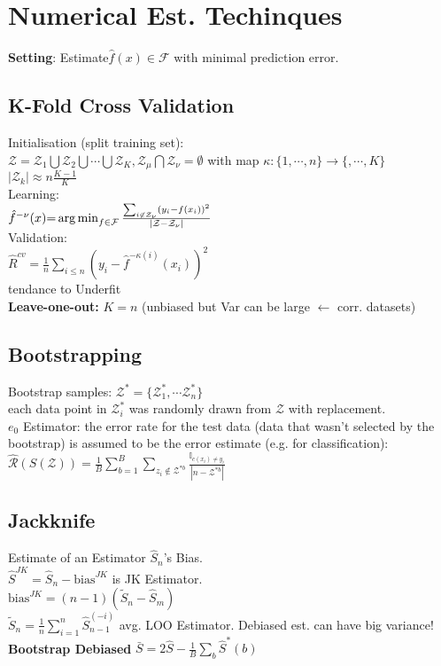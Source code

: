 \section*{Numerical Est. Techinques}
\textbf{Setting}: Estimate$\hat{f}(x) \in \mathcal{F}$ with minimal prediction error.

\subsection*{K-Fold Cross Validation}
Initialisation (split training set):\\
$\mathcal{Z}=\mathcal{Z}_1\bigcup\mathcal{Z}_2\bigcup\cdots\bigcup\mathcal{Z}_K, \mathcal{Z}_\mu \bigcap\mathcal{Z}_\nu = \emptyset $
with map $\kappa:\{1,\cdots, n\} \rightarrow\{, \cdots, K\}$
$|\mathcal{Z}_k|\approx n\frac{K-1}{K}$\\
Learning:\\
$\hat{f}^{-\nu}(x){=}
\operatorname*{arg\,min}_{f\in\mathcal{F}}\frac{\sum_{i\not\in\mathcal{Z}_\nu}(y_i-f(x_i))^2}{|\mathcal{Z}-\mathcal{Z}_{\nu}|}$\\
Validation:\\
$\hat{R}^{cv} = \frac{1}{n}\sum_{i\leq n}(y_i-\hat{f}^{-\kappa(i)}(x_i))^2$\\
tendance to Underfit\\
\textbf{Leave-one-out:} $K=n$ (unbiased but Var can be large $\leftarrow$ corr. datasets)

\subsection*{Bootstrapping}
Bootstrap samples: $\mathcal{Z}^*=\{\mathcal{Z}_1^*, \cdots\mathcal{Z}_n^*\}$\\
each data point in $\mathcal{Z}_i^*$ was randomly drawn from $\mathcal{Z}$ with replacement.\\
$e_0$ Estimator: the error rate for the test data (data that wasn't selected by the bootstrap) is assumed to be the error estimate (e.g. for classification):\\
$\hat{\mathcal{R}}(S(\mathcal{Z}))=\frac{1}{B}\sum_{b=1}^B\sum_{z_i\not\in\mathcal{Z}^{*b}}\frac{\mathbb{I}_{c(x_i)\neq y_i}}{|n-\mathcal{Z}^{*b}|}$

\subsection*{Jackknife}
Estimate of an Estimator $\hat{S}_n$'s Bias.\\
$\hat{S}^{JK}=\hat{S}_n-\mathrm{bias}^{JK}$ is JK Estimator.\\
$\mathrm{bias}^{JK}{=}(n{-}1)(\tilde{S}_n{-}\hat{S}_m)$\\
$\tilde{S}_n{=}\frac{1}{n}\sum_{i=1}^n\hat{S}_{n{-}1}^{({-}i)}$ avg. LOO Estimator.
Debiased est. can have big variance!\\
\textbf{Bootstrap Debiased} $\bar{S}{=}2\hat{S}{-}\frac{1}{B}\sum_b\hat{S}^*(b)$